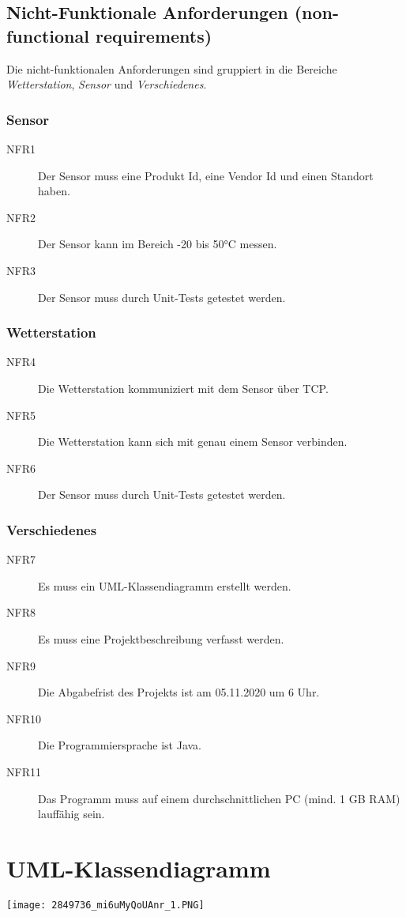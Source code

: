 \documentclass[a4paper]{report}
\begin{document}
\section{Nicht-Funktionale Anforderungen (non-functional requirements)}
Die nicht-funktionalen Anforderungen sind gruppiert in die Bereiche \textit{Wetterstation}, \textit{Sensor} 
und \textit{Verschiedenes}.
\subsection{Sensor}
\begin{description}
    \item[NFR1] Der Sensor muss eine Produkt Id, eine Vendor Id und einen Standort haben.
    \item[NFR2] Der Sensor kann im Bereich -20 bis 50°C  messen.
    \item[NFR3] Der Sensor muss durch Unit-Tests getestet werden.
\end{description}

\subsection{Wetterstation}
\begin{description}
    \item[NFR4] Die Wetterstation kommuniziert mit dem Sensor über TCP.
    \item[NFR5] Die Wetterstation kann sich mit genau einem Sensor verbinden.
    \item[NFR6] Der Sensor muss durch Unit-Tests getestet werden.
\end{description}

\subsection{Verschiedenes}
\begin{description}
    \item[NFR7] Es muss ein UML-Klassendiagramm erstellt werden.
    \item[NFR8] Es muss eine Projektbeschreibung verfasst werden.
    \item[NFR9] Die Abgabefrist des Projekts ist am 05.11.2020 um 6 Uhr.
    \item[NFR10] Die Programmiersprache ist Java.
    \item[NFR11] Das Programm muss auf einem durchschnittlichen PC (mind. 1 GB RAM) lauffähig sein. 
\end{description}

\chapter{UML-Klassendiagramm}
\texttt{[image: 2849736\_mi6uMyQoUAnr\_1.PNG]}
\end{document}
